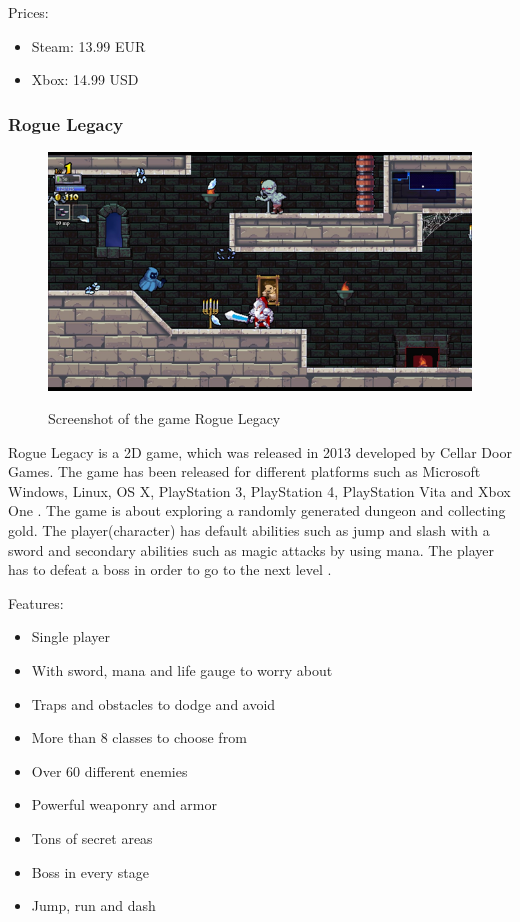 \documentclass[12p]{article}
\begin{document}
Prices:

\begin{itemize}
  \item Steam: 13.99 EUR
  \item Xbox: 14.99 USD
\end{itemize}

\subsubsection{Rogue Legacy}

\begin{figure}[ht]
  \center
  \includegraphics[width=1\textwidth]{StateOfTheArtScreenshots/rogue_legacy}
  \label{StateOfTheArt_Screenshots_RogueLegacy}
  \caption{Screenshot of the game Rogue Legacy \cite{RogueLegacyScreenshot}}
\end{figure}

Rogue Legacy is a 2D game, which was released in 2013 developed by Cellar Door Games. The game has been released for different platforms such as Microsoft Windows, Linux, OS X, PlayStation 3, PlayStation 4, PlayStation Vita and Xbox One \cite{RogueLegacyWiki}. The game is about exploring a randomly generated dungeon and collecting gold. The player(character) has default abilities such as jump and slash with a sword and secondary abilities such as magic attacks by using mana. The player has to defeat a boss in order to go to the next level \cite{RogueLegacyReview}.

Features: \cite{RogueLegacySteam}

\begin{itemize}
  \item Single player
  \item With sword, mana and life gauge to worry about
  \item Traps and obstacles to dodge and avoid
  \item More than 8 classes to choose from
  \item Over 60 different enemies
  \item Powerful weaponry and armor
  \item Tons of secret areas
  \item Boss in every stage
  \item Jump, run and dash
\end{itemize}
\end{document}
